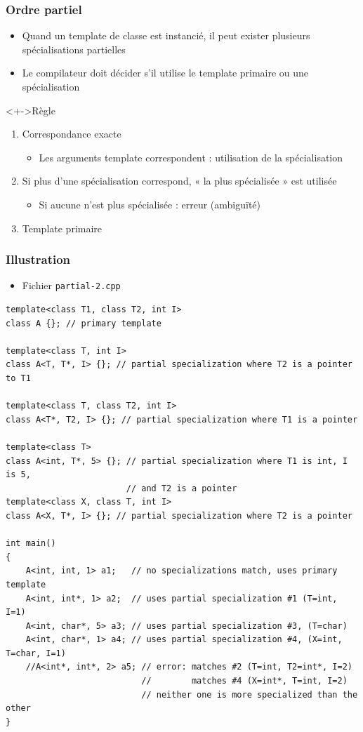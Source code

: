 \begin{frame}
\frametitle{Ordre partiel}
\begin{itemize}[<+->]
\item Quand un template de classe est instancié, il peut exister plusieurs spécialisations partielles
\item Le compilateur doit décider s'il utilise le template primaire ou une spécialisation
\end{itemize}
\begin{exampleblock}<+->{Règle}
	\begin{enumerate}[<+->]
	\item Correspondance exacte 
		\begin{itemize}
		\item Les arguments template correspondent : utilisation de la spécialisation
		\end{itemize}
	\item Si plus d'une spécialisation correspond, « la plus spécialisée » est utilisée
		\begin{itemize}
		\item Si aucune n'est plus spécialisée : erreur (ambiguïté)
		\end{itemize}
	\item Template primaire
	\end{enumerate}
\end{exampleblock}
\end{frame}

\begin{frame}[containsverbatim]
\frametitle{Illustration}
\begin{itemize}
\item Fichier \texttt{partial-2.cpp}
\end{itemize}
\begin{lstlisting}
template<class T1, class T2, int I>
class A {}; // primary template
 
template<class T, int I>
class A<T, T*, I> {}; // partial specialization where T2 is a pointer to T1
 
template<class T, class T2, int I>
class A<T*, T2, I> {}; // partial specialization where T1 is a pointer
 
template<class T>
class A<int, T*, 5> {}; // partial specialization where T1 is int, I is 5,
                        // and T2 is a pointer 
template<class X, class T, int I>
class A<X, T*, I> {}; // partial specialization where T2 is a pointer

int main()
{
	A<int, int, 1> a1;   // no specializations match, uses primary template
	A<int, int*, 1> a2;  // uses partial specialization #1 (T=int, I=1)
	A<int, char*, 5> a3; // uses partial specialization #3, (T=char)
	A<int, char*, 1> a4; // uses partial specialization #4, (X=int, T=char, I=1)
	//A<int*, int*, 2> a5; // error: matches #2 (T=int, T2=int*, I=2)
                     	   //        matches #4 (X=int*, T=int, I=2)
                           // neither one is more specialized than the other
}
\end{lstlisting}
\end{frame}

